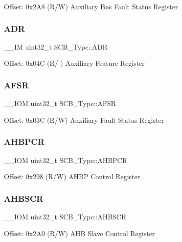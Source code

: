 Offset\+: 0x2\+A8 (R/W) Auxiliary Bus Fault Status Register \mbox{\label{struct_s_c_b___type_af084e1b2dad004a88668efea1dfe7fa1}} 
\subsubsection{\texorpdfstring{ADR}{ADR}}
{\footnotesize\ttfamily \+\_\+\+\_\+\+IM uint32\+\_\+t S\+C\+B\+\_\+\+Type\+::\+A\+DR}

Offset\+: 0x04C (R/ ) Auxiliary Feature Register \mbox{\label{struct_s_c_b___type_ab65372404ce64b0f0b35e2709429404e}} 
\subsubsection{\texorpdfstring{AFSR}{AFSR}}
{\footnotesize\ttfamily \+\_\+\+\_\+\+I\+OM uint32\+\_\+t S\+C\+B\+\_\+\+Type\+::\+A\+F\+SR}

Offset\+: 0x03C (R/W) Auxiliary Fault Status Register \mbox{\label{struct_s_c_b___type_a0d53bcea294422b5b4ecfdcd9cdc1773}} 
\subsubsection{\texorpdfstring{AHBPCR}{AHBPCR}}
{\footnotesize\ttfamily \+\_\+\+\_\+\+I\+OM uint32\+\_\+t S\+C\+B\+\_\+\+Type\+::\+A\+H\+B\+P\+CR}

Offset\+: 0x298 (R/W) A\+H\+BP Control Register \mbox{\label{struct_s_c_b___type_a8c9d9eac30594dd061d34cfaacd5e4bb}} 
\subsubsection{\texorpdfstring{AHBSCR}{AHBSCR}}
{\footnotesize\ttfamily \+\_\+\+\_\+\+I\+OM uint32\+\_\+t S\+C\+B\+\_\+\+Type\+::\+A\+H\+B\+S\+CR}

Offset\+: 0x2\+A0 (R/W) A\+HB Slave Control Register \mbox{\label{struct_s_c_b___type_ad3e5b8934c647eb1b7383c1894f01380}} 
